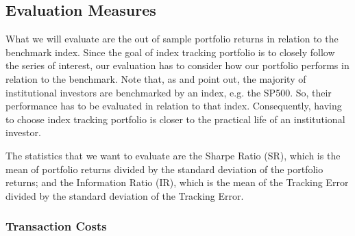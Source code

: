 \documentclass[12pt,oneside,a4paper]{memoir}
\begin{document}
\subsection{Evaluation Measures} %

What we will evaluate are the out of sample portfolio returns in relation to the benchmark index.
Since the goal of index tracking portfolio is to closely follow the series of interest, our evaluation has to consider how our portfolio performs in relation to the benchmark.
Note that, as  and  point out, the majority of institutional investors are benchmarked by an index, e.g. the SP500.
So, their performance has to be evaluated in relation to that index.
Consequently, having to choose index tracking portfolio is closer to the practical life of an institutional investor.


The statistics that we want to evaluate are the Sharpe Ratio (SR), which is the mean of portfolio returns divided by the standard deviation of the portfolio returns; and the Information Ratio (IR), which is the mean of the Tracking Error divided by the standard deviation of the Tracking Error.


% 

\subsubsection*{Transaction Costs}
\end{document}

